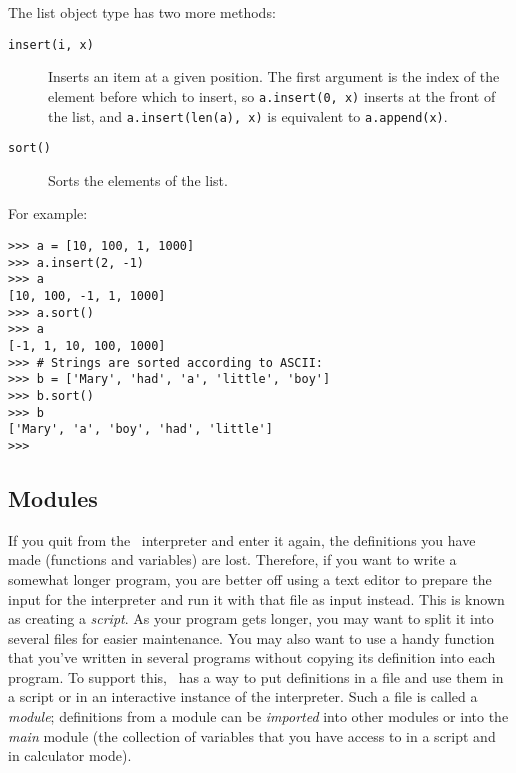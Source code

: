 The list object type has two more methods:
\begin{description}
\item[{\tt insert(i, x)}]
Inserts an item at a given position.
The first argument is the index of the element before which to insert,
so {\tt a.insert(0, x)} inserts at the front of the list, and
{\tt a.insert(len(a), x)} is equivalent to {\tt a.append(x)}.
\item[{\tt sort()}]
Sorts the elements of the list.
\end{description}
For example:
\bcode\begin{verbatim}
>>> a = [10, 100, 1, 1000]
>>> a.insert(2, -1)
>>> a
[10, 100, -1, 1, 1000]
>>> a.sort()
>>> a
[-1, 1, 10, 100, 1000]
>>> # Strings are sorted according to ASCII:
>>> b = ['Mary', 'had', 'a', 'little', 'boy']
>>> b.sort()
>>> b
['Mary', 'a', 'boy', 'had', 'little']
>>> 
\end{verbatim}\ecode

\subsection{Modules}

If you quit from the \Python\ interpreter and enter it again, the
definitions you have made (functions and variables) are lost.
Therefore, if you want to write a somewhat longer program, you are
better off using a text editor to prepare the input for the interpreter
and run it with that file as input instead.
This is known as creating a
{\em script}.
As your program gets longer, you may want to split it into several files
for easier maintenance.
You may also want to use a handy function that you've written in several
programs without copying its definition into each program.
To support this, \Python\ has a way to put definitions in a file and use
them in a script or in an interactive instance of the interpreter.
Such a file is called a
{\em module};
definitions from a module can be
{\em imported}
into other modules or into the
{\em main}
module (the collection of variables that you have access to in
a script and in calculator mode).

